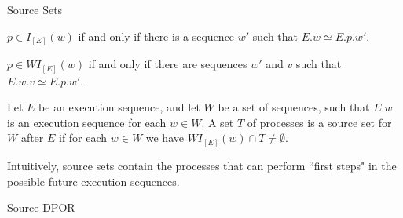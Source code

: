 \documentclass[9pt]{beamer}
\begin{document}
\begin{frame}{Source Sets}

\begin{definition}
    $p \in I_{[E]}(w)$ if and only if there is a sequence $w'$ such that $E.w \simeq E.p.w'$.
\end{definition}


\begin{definition}

$p \in WI_{[E]}(w)$ if and only if there are sequences $w'$ and $v$ such
that $E.w.v \simeq E.p.w'$.

\end{definition}

\begin{definition}
Let $E$ be an execution sequence,
and let $W$ be a set of sequences, such that $E.w$ is an execution
sequence for each $w \in W$. A set $T$ of processes is a source set for
$W$ after $E$ if for each $w \in W$ we have $WI_{[E]}(w) \cap T  \neq \emptyset$.
\end{definition}

Intuitively,
source sets contain the processes that can perform ``first steps" in the
possible future execution sequences.
    
\end{frame}


\begin{frame}{Source-DPOR}

\begin{figure}
    
\end{figure}

\end{frame}
\end{document}
